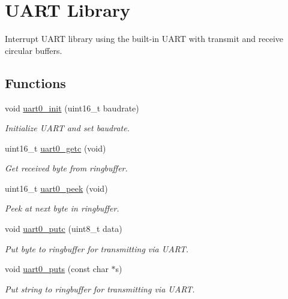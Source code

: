 \hypertarget{group__avr-uart}{}\section{U\+A\+R\+T Library}
\label{group__avr-uart}


Interrupt U\+A\+R\+T library using the built-\/in U\+A\+R\+T with transmit and receive circular buffers.  


\subsection*{Functions}
\begin{DoxyCompactItemize}
\item 
void \hyperlink{group__avr-uart_ga51de0a3b835652d285f354c078669e75}{uart0\+\_\+init} (uint16\+\_\+t baudrate)
\begin{DoxyCompactList}\small\item\em Initialize U\+A\+R\+T and set baudrate. \end{DoxyCompactList}\item 
uint16\+\_\+t \hyperlink{group__avr-uart_ga35407e8f77fa39c1a6b8504707b13dd2}{uart0\+\_\+getc} (void)
\begin{DoxyCompactList}\small\item\em Get received byte from ringbuffer. \end{DoxyCompactList}\item 
uint16\+\_\+t \hyperlink{group__avr-uart_ga7f0372a14af24f02f5c6615afd6671a0}{uart0\+\_\+peek} (void)
\begin{DoxyCompactList}\small\item\em Peek at next byte in ringbuffer. \end{DoxyCompactList}\item 
void \hyperlink{group__avr-uart_gaf52cb65e977992c01d1f2b7220243f94}{uart0\+\_\+putc} (uint8\+\_\+t data)
\begin{DoxyCompactList}\small\item\em Put byte to ringbuffer for transmitting via U\+A\+R\+T. \end{DoxyCompactList}\item 
void \hyperlink{group__avr-uart_gaeff5f5ff60334be95f0b895f96c10998}{uart0\+\_\+puts} (const char $\ast$s)
\begin{DoxyCompactList}\small\item\em Put string to ringbuffer for transmitting via U\+A\+R\+T. \end{DoxyCompactList}\item 

\end{DoxyCompactItemize}
